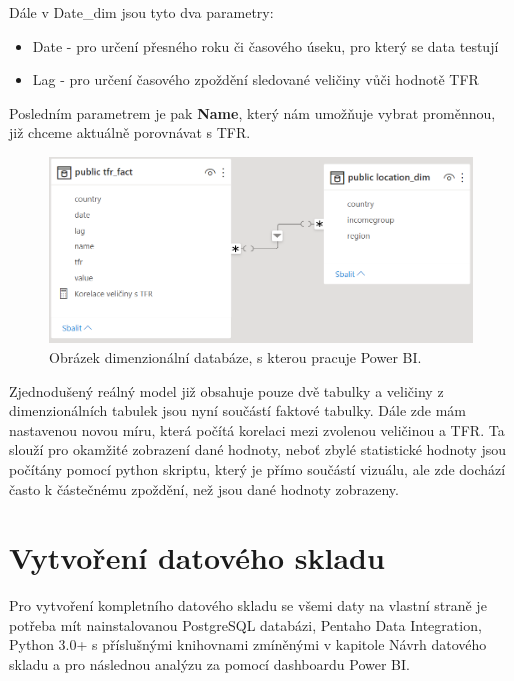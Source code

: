 \documentclass[thesis=M,czech]{FITthesis}[2022/10/08]
\begin{document}
Dále v Date\_dim jsou tyto dva parametry:

\begin{itemize}
    \item Date - pro určení přesného roku či časového úseku, pro který se data testují
    \item Lag - pro určení časového zpoždění sledované veličiny vůči hodnotě TFR

\end{itemize}


Posledním parametrem je pak \textbf{Name}, který nám umožňuje vybrat proměnnou, již chceme aktuálně porovnávat s TFR.

\begin{figure}[h]
    \centering
    \includegraphics[width=\textwidth]{DP-obrazky/DD_real.png}
    \caption{Obrázek dimenzionální databáze, s kterou pracuje Power BI.}
    \label{fig:DD_Model}
\end{figure}

Zjednodušený reálný model již obsahuje pouze dvě tabulky a veličiny z dimenzionálních tabulek jsou nyní součástí faktové tabulky. Dále zde mám nastavenou novou míru, která počítá korelaci mezi zvolenou veličinou a TFR. Ta slouží pro okamžité zobrazení dané hodnoty, neboť zbylé statistické hodnoty jsou počítány pomocí python skriptu, který je přímo součástí vizuálu, ale zde dochází často k částečnému zpoždění, než jsou dané hodnoty zobrazeny.

\section{Vytvoření datového skladu}

Pro vytvoření kompletního datového skladu se všemi daty na vlastní straně je potřeba mít nainstalovanou PostgreSQL databázi, Pentaho Data Integration, Python 3.0+ s příslušnými knihovnami zmíněnými v kapitole Návrh datového skladu a pro následnou analýzu za pomocí dashboardu Power BI. 
\end{document}

